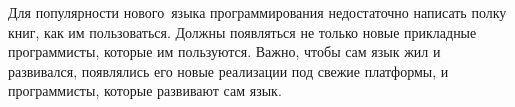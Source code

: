 \clearpage
Для популярности нового\ языка программирования недостаточно написать полку
книг, как им пользоваться. Должны появляться не только новые прикладные
программисты, которые им пользуются. Важно, чтобы сам язык жил и развивался,
появлялись его новые реализации под свежие платформы, и программисты, которые
развивают сам язык.
